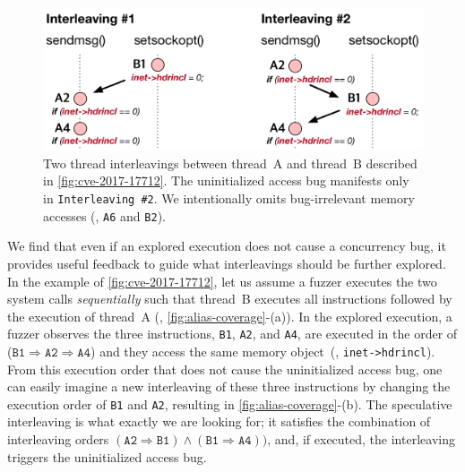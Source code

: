 \begin{figure}[t]
  \centering
  \includegraphics[width=0.8\linewidth]{fig/alias-coverage.pdf}
  \caption{Two thread interleavings between thread~A and thread~B
    described in \autoref{fig:cve-2017-17712}.
    The uninitialized access bug manifests only in
    \texttt{Interleaving \#2}.
    We intentionally omits bug-irrelevant memory accesses (\ie,
    \texttt{A6} and \texttt{B2}).}
  \label{fig:alias-coverage}
\end{figure}


%
We find that even if an explored execution does not cause a
concurrency bug, it provides useful feedback to guide what
interleavings should be further explored.
%
In the example of \autoref{fig:cve-2017-17712}, let us assume a fuzzer
executes the two system calls \textit{sequentially} such that thread~B
executes all instructions followed by the execution of thread~A (\ie,
\autoref{fig:alias-coverage}-(a)).  In the explored execution, a
fuzzer observes the three instructions, \texttt{B1}, \texttt{A2}, and
\texttt{A4}, are executed in the order of
($\texttt{B1} \Rightarrow \texttt{A2} \Rightarrow \texttt{A4}$) and
they access the same memory object~(\ie, \texttt{inet->hdrincl}).
%
From this execution order that does not cause the uninitialized access
bug, one can easily imagine a new interleaving of these three
instructions by changing the execution order of \texttt{B1} and
\texttt{A2}, resulting in \autoref{fig:alias-coverage}-(b).
%
The speculative interleaving is what exactly we are looking for; it
satisfies the combination of interleaving orders
$(\texttt{A2} \Rightarrow \texttt{B1}) \wedge (\texttt{B1} \Rightarrow
\texttt{A4}))$, and, if executed, the interleaving triggers the
uninitialized access bug.

